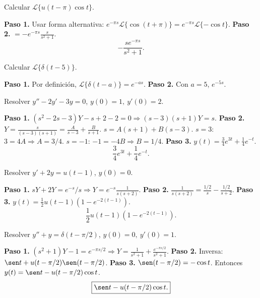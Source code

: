 \begin{prob}
Calcular $\mathcal{L}\{u(t-\pi)\cos t\}$.
\begin{myproof}
\textbf{Paso 1.} Usar forma alternativa: $e^{-\pi s}\mathcal{L}\{\cos(t+\pi)\} = e^{-\pi s}\mathcal{L}\{-\cos t\}$.
\textbf{Paso 2.} $= -e^{-\pi s}\frac{s}{s^2+1}$.
\[
\boxed{-\frac{s e^{-\pi s}}{s^2+1}.}
\]
\end{myproof}
\end{prob}

\begin{prob}
Calcular $\mathcal{L}\{\delta(t-5)\}$.
\begin{myproof}
\textbf{Paso 1.} Por definición, $\mathcal{L}\{\delta(t-a)\}=e^{-as}$.
\textbf{Paso 2.} Con $a=5$, $\boxed{e^{-5s}}$.
\end{myproof}
\end{prob}

\begin{prob}
Resolver $y'' - 2y' - 3y = 0$, $y(0)=1,\ y'(0)=2$.
\begin{myproof}
\textbf{Paso 1.} $(s^2-2s-3)Y - s + 2 - 2 = 0 \Rightarrow (s-3)(s+1)Y = s$.
\textbf{Paso 2.} $Y=\frac{s}{(s-3)(s+1)} = \frac{A}{s-3}+\frac{B}{s+1}$. $s = A(s+1)+B(s-3)$. $s=3$: $3=4A\Rightarrow A=3/4$. $s=-1$: $-1=-4B\Rightarrow B=1/4$.
\textbf{Paso 3.} $y(t)=\frac{3}{4}e^{3t} + \frac{1}{4}e^{-t}$.
\[
\boxed{\frac{3}{4}e^{3t}+\frac{1}{4}e^{-t}.}
\]
\end{myproof}
\end{prob}

\begin{prob}
Resolver $y' + 2y = u(t-1)$, $y(0)=0$.
\begin{myproof}
\textbf{Paso 1.} $sY + 2Y = e^{-s}/s \Rightarrow Y = e^{-s}\frac{1}{s(s+2)}$.
\textbf{Paso 2.} $\frac{1}{s(s+2)} = \frac{1/2}{s} - \frac{1/2}{s+2}$.
\textbf{Paso 3.} $y(t)=\frac{1}{2}u(t-1)(1 - e^{-2(t-1)})$.
\[
\boxed{\frac{1}{2}u(t-1)(1-e^{-2(t-1)}).}
\]
\end{myproof}
\end{prob}

\begin{prob}
Resolver $y'' + y = \delta(t-\pi/2)$, $y(0)=0,\ y'(0)=1$.
\begin{myproof}
\textbf{Paso 1.} $(s^2+1)Y - 1 = e^{-\pi s/2} \Rightarrow Y = \frac{1}{s^2+1} + \frac{e^{-\pi s/2}}{s^2+1}$.
\textbf{Paso 2.} Inversa: $\sen t + u(t-\pi/2)\sen(t-\pi/2)$.
\textbf{Paso 3.} $\sen(t-\pi/2)=-\cos t$. Entonces $y(t)=\sen t - u(t-\pi/2)\cos t$.
\[
\boxed{\sen t - u(t-\pi/2)\cos t.}
\]
\end{myproof}
\end{prob}

